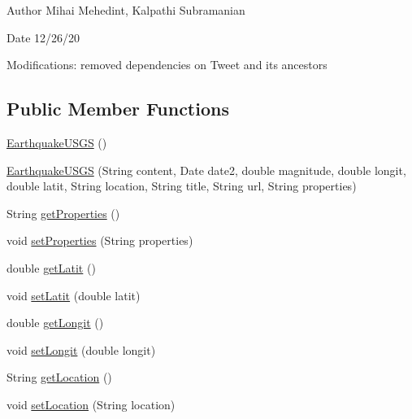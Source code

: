 \begin{DoxyAuthor}{Author}
Mihai Mehedint, Kalpathi Subramanian
\end{DoxyAuthor}
\begin{DoxyDate}{Date}
12/26/20
\end{DoxyDate}
Modifications\+: removed dependencies on Tweet and its ancestors \subsection*{Public Member Functions}
\begin{DoxyCompactItemize}
\item 
\hyperlink{classbridges_1_1data__src__dependent_1_1_earthquake_u_s_g_s_a1803f7d357ce045cefbc923e096e9646}{Earthquake\+U\+S\+GS} ()
\item 
\hyperlink{classbridges_1_1data__src__dependent_1_1_earthquake_u_s_g_s_a767aa387d5ce45c98ad01394e0937abe}{Earthquake\+U\+S\+GS} (String content, Date date2, double magnitude, double longit, double latit, String location, String title, String url, String properties)
\item 
String \hyperlink{classbridges_1_1data__src__dependent_1_1_earthquake_u_s_g_s_a6676a3f0a11accf6a510648601e05310}{get\+Properties} ()
\item 
void \hyperlink{classbridges_1_1data__src__dependent_1_1_earthquake_u_s_g_s_a2e1ee813dc91081bbd8fd8f5b343f080}{set\+Properties} (String properties)
\item 
double \hyperlink{classbridges_1_1data__src__dependent_1_1_earthquake_u_s_g_s_a1b702f3081df4e29427fd4261fd57b42}{get\+Latit} ()
\item 
void \hyperlink{classbridges_1_1data__src__dependent_1_1_earthquake_u_s_g_s_aa8ca3a3aa511f52ba8bbae88118ede95}{set\+Latit} (double latit)
\item 
double \hyperlink{classbridges_1_1data__src__dependent_1_1_earthquake_u_s_g_s_a466f3594dfe3201ec468517067c3b3e5}{get\+Longit} ()
\item 
void \hyperlink{classbridges_1_1data__src__dependent_1_1_earthquake_u_s_g_s_a6e642131d91fb89bde4f13fe579f79c6}{set\+Longit} (double longit)
\item 
String \hyperlink{classbridges_1_1data__src__dependent_1_1_earthquake_u_s_g_s_a703492ad551b68ab6b7821646f9a92ec}{get\+Location} ()
\item 
void \hyperlink{classbridges_1_1data__src__dependent_1_1_earthquake_u_s_g_s_a473107844daa1ef938dd1b78e585185b}{set\+Location} (String location)
\item 

\end{DoxyCompactItemize}
